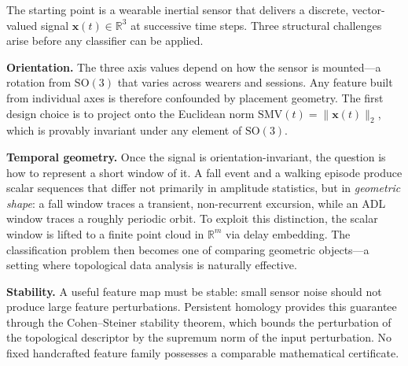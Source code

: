 \documentclass[onluarkali,ingilizce,yukseklisans,karton,LisansustuEgitim]{itutez}
\providecommand{\R}{\mathbb{R}}
\providecommand{\1}{\mathbf{1}}
\begin{document}
The starting point is a wearable inertial sensor that delivers a discrete, vector-valued signal $\mathbf{x}(t)\in\R^3$ at successive time steps. Three structural challenges arise before any classifier can be applied.

\textbf{Orientation.} The three axis values depend on how the sensor is mounted---a rotation from $\mathrm{SO}(3)$ that varies across wearers and sessions. Any feature built from individual axes is therefore confounded by placement geometry. The first design choice is to project onto the Euclidean norm $\mathrm{SMV}(t)=\|\mathbf{x}(t)\|_2$, which is provably invariant under any element of $\mathrm{SO}(3)$.

\textbf{Temporal geometry.} Once the signal is orientation-invariant, the question is how to represent a short window of it. A fall event and a walking episode produce scalar sequences that differ not primarily in amplitude statistics, but in \emph{geometric shape}: a fall window traces a transient, non-recurrent excursion, while an ADL window traces a roughly periodic orbit. To exploit this distinction, the scalar window is lifted to a finite point cloud in $\R^m$ via delay embedding. The classification problem then becomes one of comparing geometric objects---a setting where topological data analysis is naturally effective.

\textbf{Stability.} A useful feature map must be stable: small sensor noise should not produce large feature perturbations. Persistent homology provides this guarantee through the Cohen--Steiner stability theorem, which bounds the perturbation of the topological descriptor by the supremum norm of the input perturbation. No fixed handcrafted feature family possesses a comparable mathematical certificate.
\end{document}
